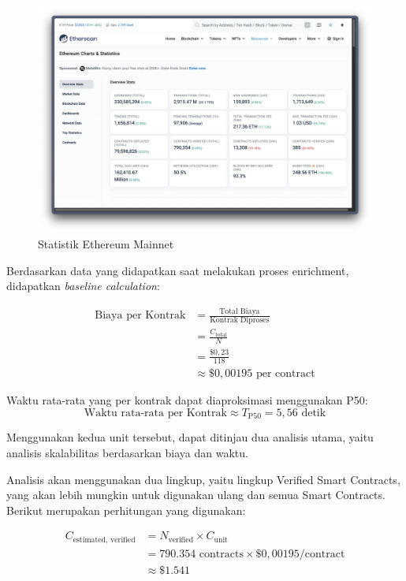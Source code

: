\begin{figure}[ht]
	\centering
	\includegraphics[width=1\textwidth]{resources/chapter-4/smart-contracts.png}
	\caption{Statistik Ethereum Mainnet}
	\label{image:etherscan-smart-contracts}
\end{figure}

Berdasarkan data yang didapatkan saat melakukan proses enrichment, didapatkan \textit{baseline calculation}:

\begin{align*}
    \text{Biaya per Kontrak} &= \frac{\text{Total Biaya}}{\text{Kontrak Diproses}} \\
    &= \frac{C_{\text{total}}}{N} \\
    &= \frac{\$0,23}{118} \\
    &\approx \$0,00195 \text{ per contract}
\end{align*}

Waktu rata-rata yang per kontrak dapat diaproksimasi menggunakan P50:
\[
\text{Waktu rata-rata per Kontrak} \approx T_{\text{P50}} = 5,56 \text{ detik}
\]

Menggunakan kedua unit tersebut, dapat ditinjau dua analisis utama, yaitu analisis skalabilitas berdasarkan biaya dan waktu.


Analisis akan menggunakan dua lingkup, yaitu lingkup Verified Smart Contracts, yang akan lebih mungkin untuk digunakan ulang dan semua Smart Contracts. Berikut merupakan perhitungan yang digunakan:

\begin{align*}
	C_{\text{estimated, verified}} &= N_{\text{verified}} \times C_{\text{unit}} \\
	&= 790.354 \text{ contracts} \times \$0,00195/\text{contract} \\
	&\approx \$1.541
\end{align*}

